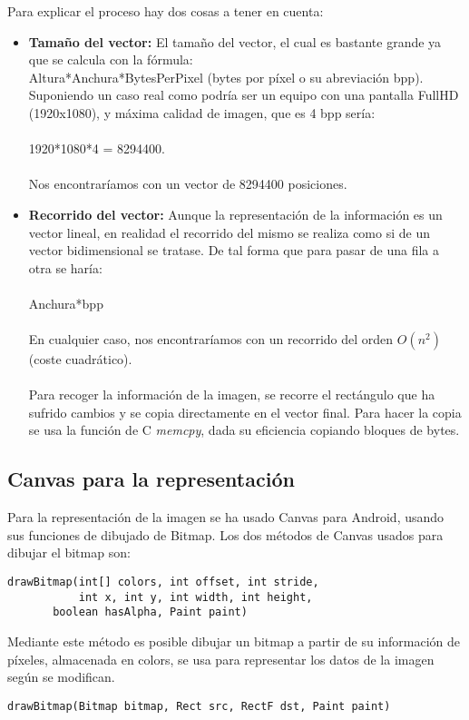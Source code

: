 Para explicar el proceso hay dos cosas a tener en cuenta:
\begin{itemize}
\item \textbf{Tamaño del vector:} El tamaño del vector, el cual es bastante grande ya que se calcula con la fórmula:\\
Altura*Anchura*BytesPerPixel (bytes por píxel o su abreviación bpp).\\
Suponiendo un caso real como podría ser un equipo con una pantalla FullHD (1920x1080), y máxima calidad de imagen, que es 4 bpp sería:\\
\\
1920*1080*4 = 8294400.\\
\\
Nos encontraríamos con un vector de 8294400 posiciones.\newpage
\item \textbf{Recorrido del vector:} Aunque la representación de la información es un vector lineal, en realidad el recorrido del mismo se realiza como si de un vector bidimensional se tratase. De tal forma que para pasar de una fila a otra se haría:\\
\\
Anchura*bpp\\
\\
En cualquier caso, nos encontraríamos con un recorrido del orden $O(n^2)$ (coste cuadrático).\\
\\
Para recoger la información de la imagen, se recorre el rectángulo que ha sufrido cambios y se copia directamente en el vector final. Para hacer la copia se usa la función de C \emph{memcpy}, dada su eficiencia copiando bloques de bytes.\\
\end{itemize}

\subsection{Canvas para la representación}

Para la representación de la imagen se ha usado Canvas para Android, usando sus funciones de dibujado de Bitmap. Los dos métodos de Canvas usados para dibujar el bitmap son:
\begin{lstlisting}
drawBitmap(int[] colors, int offset, int stride, 
           int x, int y, int width, int height, 
	   boolean hasAlpha, Paint paint)
\end{lstlisting}

Mediante este método es posible dibujar un bitmap a partir de su información de píxeles, almacenada en colors, se usa para representar los datos de la imagen según se modifican.
\begin{lstlisting}
drawBitmap(Bitmap bitmap, Rect src, RectF dst, Paint paint)
\end{lstlisting}


